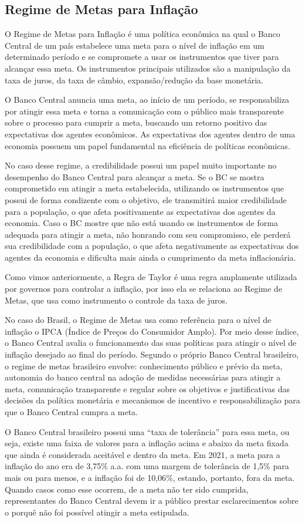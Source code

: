 \subsection*{Regime de Metas para Inflação}
O Regime de Metas para Inflação é uma política econômica na qual o Banco Central de um país estabelece uma meta para o nível de inflação em um determinado período e se compromete a usar os instrumentos que tiver para alcançar essa meta. Os instrumentos principais utilizados são a manipulação da taxa de juros, da taxa de câmbio, expansão/redução da base monetária. 

O Banco Central anuncia uma meta, ao início de um período, se responsabiliza por atingir essa meta e torna a comunicação com o público mais transparente sobre o processo para cumprir a meta, buscando um retorno positivo das expectativas dos agentes econômicos. As expectativas dos agentes dentro de uma economia possuem um papel fundamental na eficiência de políticas econômicas.

No caso desse regime, a credibilidade possui um papel muito importante no desempenho do Banco Central para alcançar a meta. Se o BC se mostra comprometido em atingir a meta estabelecida, utilizando os instrumentos que possui de forma condizente com o objetivo, ele transmitirá maior credibilidade para a população, o que afeta positivamente as expectativas dos agentes da economia. Caso o BC mostre que não está usando os instrumentos de forma adequada para atingir a meta, não honrando com seu compromisso, ele perderá sua credibilidade com a população, o que afeta negativamente as expectativas dos agentes da economia e dificulta mais ainda o cumprimento da meta inflacionária. 

Como vimos anteriormente, a Regra de Taylor é uma regra amplamente utilizada por governos para controlar a inflação, por isso ela se relaciona ao Regime de Metas, que usa como instrumento o controle da taxa de juros. 
	
No caso do Brasil, o Regime de Metas usa como referência para o nível de inflação o IPCA (Índice de Preços do Consumidor Amplo). Por meio desse índice, o Banco Central avalia o funcionamento das suas políticas para atingir o nível de inflação desejado ao final do período. Segundo o próprio Banco Central brasileiro, o regime de metas brasileiro envolve: conhecimento público e prévio da meta, autonomia do banco central na adoção de medidas necessárias para atingir a meta, comunicação transparente e regular sobre os objetivos e justificativas das decisões da política monetária e mecanismos de incentivo e responsabilização para que o Banco Central cumpra a meta. 

O Banco Central brasileiro possui uma “taxa de tolerância” para essa meta, ou seja, existe uma faixa de valores para a inflação acima e abaixo da meta fixada que ainda é considerada aceitável e dentro da meta. Em 2021, a meta para a inflação do ano era de 3,75$\%$ a.a. com uma margem de tolerância de 1,5$\%$ para mais ou para menos, e a inflação foi de 10,06$\%$, estando, portanto, fora da meta. Quando casos como esse ocorrem, de a meta não ter sido cumprida, representantes do Banco Central devem ir a público prestar esclarecimentos sobre o porquê não foi possível atingir a meta estipulada.

